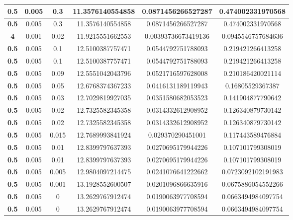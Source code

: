 \begin{table}[]
\begin{tabular}{|S|S|S|S|S|S|}
		\textbf{0.5}  & 0.005   & 0.3         & 11.3576140554858   & 0.0871456266527287   & 0.474002331970568     \\ \hline
		\textbf{0.5}  & 0.005   & 0.3         & 11.3576140554858   & 0.0871456266527287   & 0.474002331970568     \\ \hline
		\textbf{4}    & 0.001   & 0.02        & 11.9215551662553   & 0.00393736673419136  & 0.0945546757684636    \\ \hline
		\textbf{0.5}  & 0.005   & 0.1         & 12.5100387757471   & 0.0544792751788093   & 0.219421266413258     \\ \hline
		\textbf{0.5}  & 0.005   & 0.1         & 12.5100387757471   & 0.0544792751788093   & 0.219421266413258     \\ \hline
		\textbf{0.5}  & 0.005   & 0.09        & 12.5551042043796   & 0.0521716597628008   & 0.210186420021114     \\ \hline
		\textbf{0.5}  & 0.005   & 0.05        & 12.6768374367233   & 0.0416131189119943   & 0.16805529367387      \\ \hline
		\textbf{0.5}  & 0.005   & 0.03        & 12.7029819927035   & 0.0351580682053523   & 0.141904877790642     \\ \hline
		\textbf{0.5}  & 0.005   & 0.02        & 12.7325582345358   & 0.0314332612908952   & 0.126340879730142     \\ \hline
		\textbf{0.5}  & 0.005   & 0.02        & 12.7325582345358   & 0.0314332612908952   & 0.126340879730142     \\ \hline
		\textbf{0.5}  & 0.005   & 0.015       & 12.7689993841924   & 0.029370290451001    & 0.117443589476884     \\ \hline
		\textbf{0.5}  & 0.005   & 0.01        & 12.8399797637393   & 0.0270695179944226   & 0.107101799308019     \\ \hline
		\textbf{0.5}  & 0.005   & 0.01        & 12.8399797637393   & 0.0270695179944226   & 0.107101799308019     \\ \hline
		\textbf{0.5}  & 0.005   & 0.005       & 12.9804097214475   & 0.0241076641222662   & 0.0723092102191983    \\ \hline
		\textbf{0.5}  & 0.005   & 0.001       & 13.1928552600507   & 0.0201096866635916   & 0.0675886054552266    \\ \hline
		\textbf{0.5}  & 0.005   & 0           & 13.2629767912474   & 0.0190063977708594   & 0.0663494984097754    \\ \hline
		\textbf{0.5}  & 0.005   & 0           & 13.2629767912474   & 0.0190063977708594   & 0.0663494984097754    \\ \hline

\end{tabular}
\end{table}

